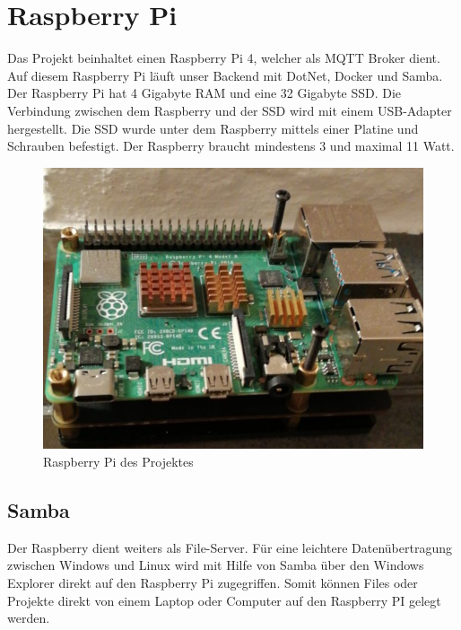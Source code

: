 \section{Raspberry Pi}

Das Projekt beinhaltet einen Raspberry Pi 4, welcher als MQTT Broker dient. Auf diesem Raspberry Pi läuft unser Backend mit DotNet, Docker und Samba.
Der Raspberry Pi hat 4 Gigabyte RAM und eine 32 Gigabyte SSD. 
Die Verbindung zwischen dem Raspberry und der SSD wird mit einem USB-Adapter hergestellt. 
Die SSD wurde unter dem Raspberry mittels einer Platine und Schrauben befestigt. 
Der Raspberry braucht mindestens 3 und maximal 11 Watt. 


\begin{figure}[H]
    \centering
    \includegraphics[width=1\textwidth]{pics/Raspberry.JPG}
    \caption{Raspberry Pi des Projektes}
\end{figure}

\subsection{Samba}
Der Raspberry dient weiters als File-Server. Für eine leichtere Datenübertragung zwischen Windows und Linux wird mit Hilfe von Samba über den Windows Explorer direkt auf den Raspberry Pi zugegriffen.
Somit können Files oder Projekte direkt von einem Laptop oder Computer auf den Raspberry PI gelegt werden.


